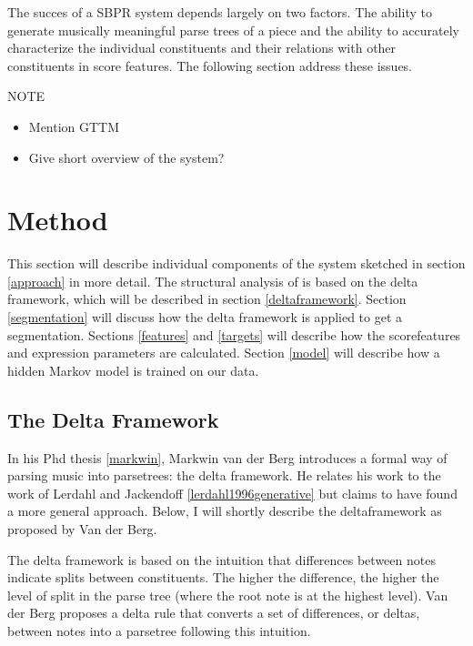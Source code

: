 \documentclass[a4paper,10pt]{article}
\begin{document}
The succes of a SBPR system depends largely on two factors. The ability to generate musically meaningful parse trees of a piece and the ability to accurately characterize the individual constituents and their relations with other constituents in score features. The following section address these issues. 

NOTE
\begin{itemize}
\item Mention GTTM
\item Give short overview of the system?
\end{itemize}


\section{Method}

This section will describe individual components of the system sketched in section \ref{approach} in more detail. The structural analysis of is based on the delta framework, which will be described in section \ref{deltaframework}.  Section \ref{segmentation} will discuss how the delta framework is applied to get a segmentation. Sections \ref{features} and \ref{targets} will describe how the scorefeatures and expression parameters are calculated. Section \ref{model} will describe how a hidden Markov model is trained on our data.

\subsection{The Delta Framework}

In his Phd thesis \ref{markwin}, Markwin van der Berg introduces a formal way of parsing music into parsetrees: the delta framework. He relates his work to the work of Lerdahl and Jackendoff \ref{lerdahl1996generative} but claims to have found a more general approach. Below, I will shortly describe the deltaframework as proposed by Van der Berg.

The delta framework is based on the intuition that differences between notes indicate splits between constituents. The higher the difference, the higher the level of split in the parse tree (where the root note is at the highest level). Van der Berg proposes a delta rule that converts a set of differences, or deltas, between notes into a parsetree following this intuition. 
\end{document}
